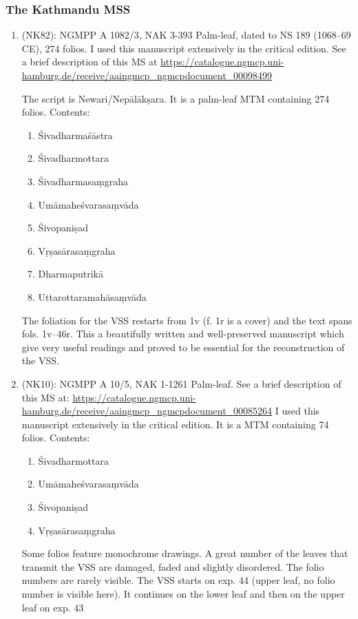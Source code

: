 \documentclass[11pt]{article}
\begin{document}
\subsubsection{The Kathmandu MSS}
\label{sec:org25dc199}
\begin{enumerate}
\item \msNa (NK82): NGMPP A 1082/3, NAK 3-393
\label{sec:org5500a28}
Palm-leaf, dated to NS 189 (1068--69 CE), 274 folios.
I used this manuscript extensively in the critical edition. 
See a brief description of this MS at
     \url{https://catalogue.ngmcp.uni-hamburg.de/receive/aaingmcp\_ngmcpdocument\_00098499}

The script is Newari/Nepālākṣara.
It is a palm-leaf MTM containing 274 folios.
Contents:
\begin{enumerate}
\item Śivadharmaśāstra
\item Śivadharmottara
\item Śivadharmasaṃgraha
\item Umāmaheśvarasaṃvāda
\item Śivopaniṣad
\item Vṛṣasārasaṃgraha
\item Dharmaputrikā
\item Uttarottaramahāsaṃvāda
\end{enumerate}
The foliation for the VSS restarts from 1v (f. 1r is a cover) and
the text spans fols. 1v--46r. 
This a beautifully written and well-preserved manuscript which give
very useful readings and proved to be essential for the
reconstruction of the VSS.
\item \msNb (NK10): NGMPP A 10/5, NAK 1-1261
\label{sec:org3d1adc0}
Palm-leaf.
See a brief description of this MS at:
      \url{https://catalogue.ngmcp.uni-hamburg.de/receive/aaingmcp\_ngmcpdocument\_00085264}
I used this manuscript extensively in the critical edition. 
It is a MTM containing 74 folios.
Contents: 
\begin{enumerate}
\item Śivadharmottara
\item Umāmaheśvarasaṃvāda
\item Śivopaniṣad
\item Vṛṣasārasaṃgraha
\end{enumerate}
Some folios feature monochrome drawings.
A great number of the leaves that transmit the VSS
are damaged, faded and slightly disordered. The folio numbers are rarely visible.
The VSS starts on exp. 44 (upper leaf, no folio number is visible here).
It continues on the lower leaf and then on the upper leaf on exp. 43

\end{enumerate}
\end{document}
